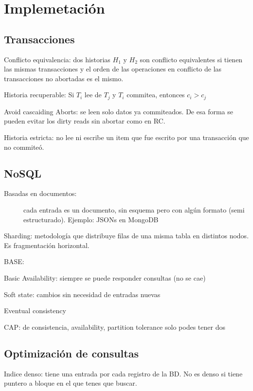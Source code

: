 \chapter{Implemetación}

\section{Transacciones}

Conflicto equivalencia: dos historias $H_1$ y $H_2$ son conflicto equivalentes si tienen las mismas transacciones y el
orden de las operaciones en conflicto de las transacciones no abortadas es el mismo.

Historia recuperable: Si $T_i$ lee de $T_j$ y $T_i$ commitea, entonces $c_i > c_j$

Avoid cascaiding Aborts: se leen solo datos ya commiteados. De esa forma se pueden evitar los dirty reads sin abortar como en RC.

Historia estricta: no lee ni escribe un item que fue escrito por una transacción que no commiteó.

\section{NoSQL}

\begin{description}
	\item[Basadas en documentos:] cada entrada es un documento, sin esquema pero con algún formato (semi estructurado). Ejemplo: JSONs en MongoDB
\end{description}

Sharding: metodología que distribuye filas de una misma tabla en distintos nodos. Es fragmentación horizontal.

BASE:

Basic Availability: siempre se puede responder consultas (no se cae)

Soft state: cambios sin necesidad de entradas nuevas

Eventual consistency

CAP: de consistencia, availability, partition tolerance solo podes tener dos

\section{Optimización de consultas}

Indice denso: tiene una entrada por cada registro de la BD. No es denso si tiene puntero a bloque en el que tenes que buscar.


